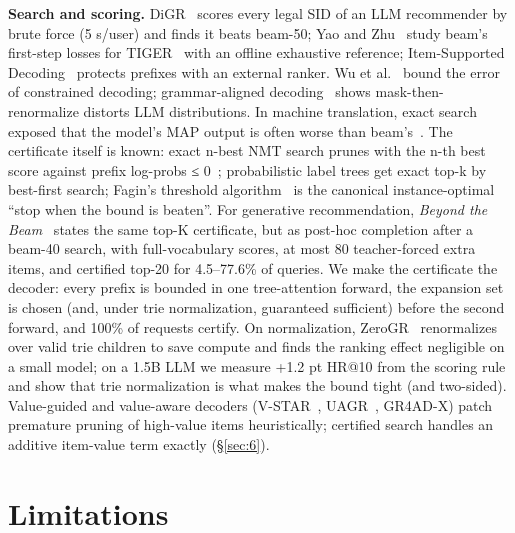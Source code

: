 \documentclass[11pt]{article}
\begin{document}
\textbf{Search and scoring.} DiGR~\cite{ax2602.07847} scores every legal SID of an LLM recommender by brute force (5 s/user) and finds it beats beam-50; Yao and Zhu~\cite{ax2611.01072} study beam's first-step losses for TIGER~\cite{rajput2023} with an offline exhaustive reference; Item-Supported Decoding~\cite{ax2607.24995} protects prefixes with an external ranker. Wu et al.~\cite{ax2504.09935} bound the error of constrained decoding; grammar-aligned decoding~\cite{ax2405.21047} shows mask-then-renormalize distorts LLM distributions. In machine translation, exact search exposed that the model's MAP output is often worse than beam's~\cite{stahlberg2019,meister2020}. The certificate itself is known: exact n-best NMT search prunes with the n-th best score against prefix log-probs ≤ 0~\cite{stahlberg2022}; probabilistic label trees get exact top-k by best-first search; Fagin's threshold algorithm~\cite{fagin2003} is the canonical instance-optimal ``stop when the bound is beaten''. For generative recommendation, \emph{Beyond the Beam}~\cite{ax2609.33745} states the same top-K certificate, but as post-hoc completion after a beam-40 search, with full-vocabulary scores, at most 80 teacher-forced extra items, and certified top-20 for 4.5–77.6\% of queries. We make the certificate the decoder: every prefix is bounded in one tree-attention forward, the expansion set is chosen (and, under trie normalization, guaranteed sufficient) before the second forward, and 100\% of requests certify. On normalization, ZeroGR~\cite{ax2611.04715} renormalizes over valid trie children to save compute and finds the ranking effect negligible on a small model; on a 1.5B LLM we measure +1.2 pt HR@10 from the scoring rule and show that trie normalization is what makes the bound tight (and two-sided). Value-guided and value-aware decoders (V-STAR~\cite{ax2602.10699}, UAGR~\cite{ax2611.02981}, GR4AD-X) patch premature pruning of high-value items heuristically; certified search handles an additive item-value term exactly (\S\ref{sec:6}).

\section{Limitations}\label{sec:10}
\end{document}
